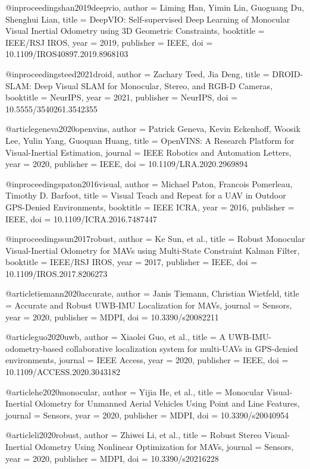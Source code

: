 @inproceedings{han2019deepvio,
  author = {Liming Han, Yimin Lin, Guoguang Du, Shenghui Lian},
  title = {DeepVIO: Self-supervised Deep Learning of Monocular Visual Inertial Odometry using 3D Geometric Constraints},
  booktitle = {IEEE/RSJ IROS},
  year = {2019},
  publisher = {IEEE},
  doi = {10.1109/IROS40897.2019.8968103}
}

@inproceedings{teed2021droid,
  author = {Zachary Teed, Jia Deng},
  title = {DROID-SLAM: Deep Visual SLAM for Monocular, Stereo, and RGB-D Cameras},
  booktitle = {NeurIPS},
  year = {2021},
  publisher = {NeurIPS},
  doi = {10.5555/3540261.3542355}
}

@article{geneva2020openvins,
  author = {Patrick Geneva, Kevin Eckenhoff, Woosik Lee, Yulin Yang, Guoquan Huang},
  title = {OpenVINS: A Research Platform for Visual-Inertial Estimation},
  journal = {IEEE Robotics and Automation Letters},
  year = {2020},
  publisher = {IEEE},
  doi = {10.1109/LRA.2020.2969894}
}

@inproceedings{paton2016visual,
  author = {Michael Paton, Francois Pomerleau, Timothy D. Barfoot},
  title = {Visual Teach and Repeat for a UAV in Outdoor GPS-Denied Environments},
  booktitle = {IEEE ICRA},
  year = {2016},
  publisher = {IEEE},
  doi = {10.1109/ICRA.2016.7487447}
}

@inproceedings{sun2017robust,
  author = {Ke Sun, et al.},
  title = {Robust Monocular Visual-Inertial Odometry for MAVs using Multi-State Constraint Kalman Filter},
  booktitle = {IEEE/RSJ IROS},
  year = {2017},
  publisher = {IEEE},
  doi = {10.1109/IROS.2017.8206273}
}

@article{tiemann2020accurate,
  author = {Janis Tiemann, Christian Wietfeld},
  title = {Accurate and Robust UWB-IMU Localization for MAVs},
  journal = {Sensors},
  year = {2020},
  publisher = {MDPI},
  doi = {10.3390/s20082211}
}

@article{guo2020uwb,
  author = {Xiaolei Guo, et al.},
  title = {A UWB-IMU-odometry-based collaborative localization system for multi-UAVs in GPS-denied environments},
  journal = {IEEE Access},
  year = {2020},
  publisher = {IEEE},
  doi = {10.1109/ACCESS.2020.3043182}
}

@article{he2020monocular,
  author = {Yijia He, et al.},
  title = {Monocular Visual-Inertial Odometry for Unmanned Aerial Vehicles Using Point and Line Features},
  journal = {Sensors},
  year = {2020},
  publisher = {MDPI},
  doi = {10.3390/s20040954}
}

@article{li2020robust,
  author = {Zhiwei Li, et al.},
  title = {Robust Stereo Visual-Inertial Odometry Using Nonlinear Optimization for MAVs},
  journal = {Sensors},
  year = {2020},
  publisher = {MDPI},
  doi = {10.3390/s20216228}
}

